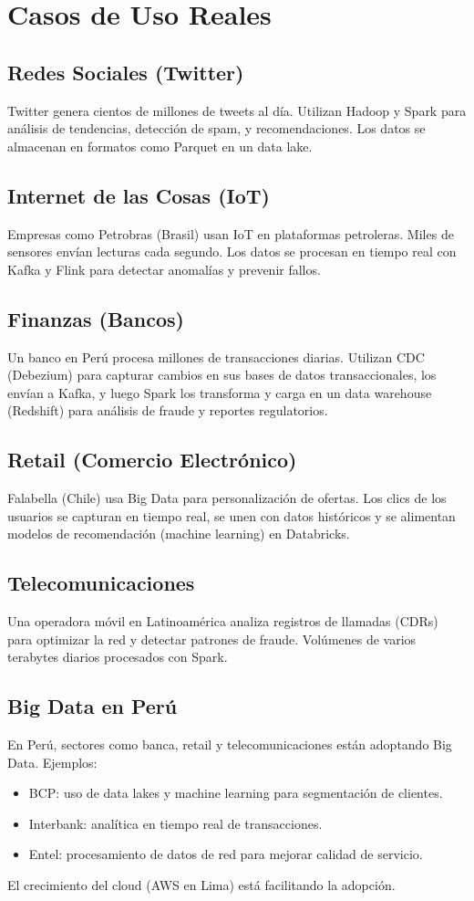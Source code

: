 \documentclass[12pt,a4paper,openany,oneside]{book}
\begin{document}
\chapter{Casos de Uso Reales}
\section{Redes Sociales (Twitter)}
Twitter genera cientos de millones de tweets al día. Utilizan Hadoop y Spark para análisis de tendencias, detección de spam, y recomendaciones. Los datos se almacenan en formatos como Parquet en un data lake.

\section{Internet de las Cosas (IoT)}
Empresas como Petrobras (Brasil) usan IoT en plataformas petroleras. Miles de sensores envían lecturas cada segundo. Los datos se procesan en tiempo real con Kafka y Flink para detectar anomalías y prevenir fallos.

\section{Finanzas (Bancos)}
Un banco en Perú procesa millones de transacciones diarias. Utilizan CDC (Debezium) para capturar cambios en sus bases de datos transaccionales, los envían a Kafka, y luego Spark los transforma y carga en un data warehouse (Redshift) para análisis de fraude y reportes regulatorios.

\section{Retail (Comercio Electrónico)}
Falabella (Chile) usa Big Data para personalización de ofertas. Los clics de los usuarios se capturan en tiempo real, se unen con datos históricos y se alimentan modelos de recomendación (machine learning) en Databricks.

\section{Telecomunicaciones}
Una operadora móvil en Latinoamérica analiza registros de llamadas (CDRs) para optimizar la red y detectar patrones de fraude. Volúmenes de varios terabytes diarios procesados con Spark.

\section{Big Data en Perú}
En Perú, sectores como banca, retail y telecomunicaciones están adoptando Big Data. Ejemplos:
\begin{itemize}
    \item BCP: uso de data lakes y machine learning para segmentación de clientes.
    \item Interbank: analítica en tiempo real de transacciones.
    \item Entel: procesamiento de datos de red para mejorar calidad de servicio.
\end{itemize}
El crecimiento del cloud (AWS en Lima) está facilitando la adopción.
\end{document}
